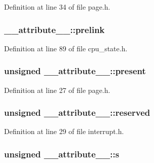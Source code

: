 \-Definition at line 34 of file page.\-h.

\hypertarget{struct____attribute_____af60139e51063111dfe8075bc8d9b4c1a}{
\subsubsection[{prelink}]{ {\bf \-\_\-\-\_\-attribute\-\_\-\-\_\-\-::prelink}}}\label{struct____attribute_____af60139e51063111dfe8075bc8d9b4c1a}


\-Definition at line 89 of file cpu\-\_\-state.\-h.

\hypertarget{struct____attribute_____a51892c7fc8fb14709cd2e83770375cab}{
\subsubsection[{present}]{\setlength{\rightskip}{0pt plus 5cm}unsigned {\bf \-\_\-\-\_\-attribute\-\_\-\-\_\-\-::present}}}\label{struct____attribute_____a51892c7fc8fb14709cd2e83770375cab}


\-Definition at line 27 of file page.\-h.

\hypertarget{struct____attribute_____a392e93fe449090605879d79ae2f62018}{
\subsubsection[{reserved}]{\setlength{\rightskip}{0pt plus 5cm}unsigned {\bf \-\_\-\-\_\-attribute\-\_\-\-\_\-\-::reserved}}}\label{struct____attribute_____a392e93fe449090605879d79ae2f62018}


\-Definition at line 29 of file interrupt.\-h.

\hypertarget{struct____attribute_____a9901ea56461918c1f560daf232bef47c}{
\subsubsection[{s}]{\setlength{\rightskip}{0pt plus 5cm}unsigned {\bf \-\_\-\-\_\-attribute\-\_\-\-\_\-\-::s}}}\label{struct____attribute_____a9901ea56461918c1f560daf232bef47c}


